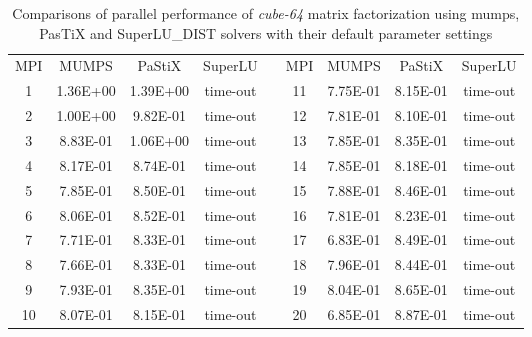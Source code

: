 \begin{table}[ht]
\centering
\begin{tabular}{|c|c|c|c|l|c|c|c|c|}
\cline{1-4} \cline{6-9}
MPI & MUMPS    & PaStiX   & SuperLU  &  & MPI & MUMPS    & PaStiX   & SuperLU  \\ \cline{1-4} \cline{6-9} 
1   & 1.36E+00 & 1.39E+00 & time-out &  & 11  & 7.75E-01 & 8.15E-01 & time-out \\ \cline{1-4} \cline{6-9} 
2   & 1.00E+00 & 9.82E-01 & time-out &  & 12  & 7.81E-01 & 8.10E-01 & time-out \\ \cline{1-4} \cline{6-9} 
3   & 8.83E-01 & 1.06E+00 & time-out &  & 13  & 7.85E-01 & 8.35E-01 & time-out \\ \cline{1-4} \cline{6-9} 
4   & 8.17E-01 & 8.74E-01 & time-out &  & 14  & 7.85E-01 & 8.18E-01 & time-out \\ \cline{1-4} \cline{6-9} 
5   & 7.85E-01 & 8.50E-01 & time-out &  & 15  & 7.88E-01 & 8.46E-01 & time-out \\ \cline{1-4} \cline{6-9} 
6   & 8.06E-01 & 8.52E-01 & time-out &  & 16  & 7.81E-01 & 8.23E-01 & time-out \\ \cline{1-4} \cline{6-9} 
7   & 7.71E-01 & 8.33E-01 & time-out &  & 17  & 6.83E-01 & 8.49E-01 & time-out \\ \cline{1-4} \cline{6-9} 
8   & 7.66E-01 & 8.33E-01 & time-out &  & 18  & 7.96E-01 & 8.44E-01 & time-out \\ \cline{1-4} \cline{6-9} 
9   & 7.93E-01 & 8.35E-01 & time-out &  & 19  & 8.04E-01 & 8.65E-01 & time-out \\ \cline{1-4} \cline{6-9} 
10  & 8.07E-01 & 8.15E-01 & time-out &  & 20  & 6.85E-01 & 8.87E-01 & time-out \\ \cline{1-4} \cline{6-9} 
\end{tabular}
\caption{Comparisons of parallel performance of  \textit{cube-64} matrix factorization using \acrshort{mumps}, PasTiX and SuperLU\_DIST solvers with their default parameter settings}
\label{table:lc-cube-64-result}
\end{table}


